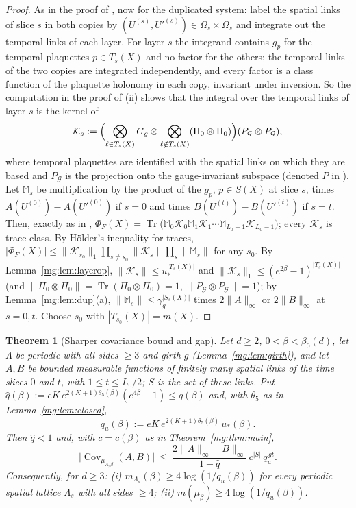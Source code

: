 \documentclass[11pt,a4paper]{article}
\newtheorem{theorem}{Theorem}[section]
\theoremstyle{definition}
\theoremstyle{remark}
\DeclareMathOperator{\Tr}{Tr}
\DeclareMathOperator{\Cov}{Cov}
\newcommand{\norm}[1]{\lVert #1\rVert}
\newcommand{\Fref}[3]{\cite[#1~`#2' (\texttt{#3})]{F}}
\newcommand{\Flab}[2]{\cite[#1 \texttt{#2}]{F}}
\begin{document}
\begin{proof}
As in the proof of \Fref{Theorem}{Transfer matrix formalism}{thm:tm}, now for the duplicated system: label the spatial links of slice $s$
in both copies by $(U^{(s)},U'^{(s)})\in\Omega_s\times\Omega_s$ and integrate out the temporal links of each layer. For layer $s$ the
integrand contains $g_p$ for the temporal plaquettes $p\in T_s(X)$ and no factor for the others; the temporal links of the two copies are
integrated independently, and every factor is a class function of the plaquette holonomy in each copy, invariant under inversion. So the
computation in the proof of \Flab{Lemma}{lem:K}(ii) shows that the integral over the temporal links of layer $s$ is the kernel of
\[
\mathcal K_s:=\Bigl(\bigotimes_{\ell\in T_s(X)}G_g\otimes\bigotimes_{\ell\notin T_s(X)}(\Pi_0\otimes\Pi_0)\Bigr)(P_{\mathcal G}\otimes P_{\mathcal G}),
\]
where temporal plaquettes are identified with the spatial links on which they are based and $P_{\mathcal G}$ is the projection onto the
gauge-invariant subspace (denoted $P$ in \cite{F}). Let $\mathbb M_s$ be multiplication by the product of the $g_p$, $p\in S(X)$ at
slice $s$, times $A(U^{(0)})-A(U'^{(0)})$ if $s=0$ and times $B(U^{(t)})-B(U'^{(t)})$ if $s=t$. Then, exactly as in \Flab{Theorem}{thm:tm},
$\Phi_F(X)=\Tr\bigl(\mathbb M_0\mathcal K_0\mathbb M_1\mathcal K_1\cdots\mathbb M_{L_0-1}\mathcal K_{L_0-1}\bigr)$; every $\mathcal K_s$ is trace
class. By H\"older's inequality for traces, $|\Phi_F(X)|\le\norm{\mathcal K_{s_0}}_1\prod_{s\ne s_0}\norm{\mathcal K_s}\prod_s\norm{\mathbb M_s}$
for any $s_0$. By Lemma~\ref{mg:lem:layerop}, $\norm{\mathcal K_s}\le u_*^{|T_s(X)|}$ and $\norm{\mathcal K_s}_1\le(e^{2\beta}-1)^{|T_s(X)|}$ (and
$\norm{\Pi_0\otimes\Pi_0}=\Tr(\Pi_0\otimes\Pi_0)=1$, $\norm{P_{\mathcal G}\otimes P_{\mathcal G}}=1$); by Lemma~\ref{mg:lem:dup}(a),
$\norm{\mathbb M_s}\le\gamma_g^{|S_s(X)|}$ times $2\norm A_\infty$ or $2\norm B_\infty$ at $s=0,t$. Choose $s_0$ with $|T_{s_0}(X)|=m(X)$.
\end{proof}

\begin{theorem}[Sharper covariance bound and gap]\label{mg:thm:sharp}
Let $d\ge2$, $0<\beta<\beta_0(d)$, let $\Lambda$ be periodic with all sides $\ge3$ and girth $g$ (Lemma~\ref{mg:lem:girth}), and let $A,B$ be
bounded measurable functions of finitely many spatial links of the time slices $0$ and $t$, with $1\le t\le L_0/2$; $S$ is the set of these
links. Put $\hat q(\beta):=eK\,e^{2(K+1)\theta_5(\beta)}(e^{4\beta}-1)\le q(\beta)$ and, with $\theta_5$ as in Lemma~\ref{mg:lem:closed},
\[
q_u(\beta):=eK\,e^{2(K+1)\theta_5(\beta)}\,u_*(\beta) .
\]
Then $\hat q<1$ and, with $c=c(\beta)$ as in Theorem~\ref{mg:thm:main},
\[
\bigl|\Cov_{\mu_{\Lambda,\beta}}(A,B)\bigr|\ \le\ \frac{2\norm A_\infty\norm B_\infty}{1-\hat q}\,c^{|S|}\,q_u^{\,gt}.
\]
Consequently, for $d\ge3$: (i) $m_{\Lambda_s}(\beta)\ge4\log(1/q_u(\beta))$ for every periodic spatial lattice $\Lambda_s$ with all sides
$\ge4$; (ii) $m(\mu_\beta)\ge4\log(1/q_u(\beta))$.
\end{theorem}
\end{document}
